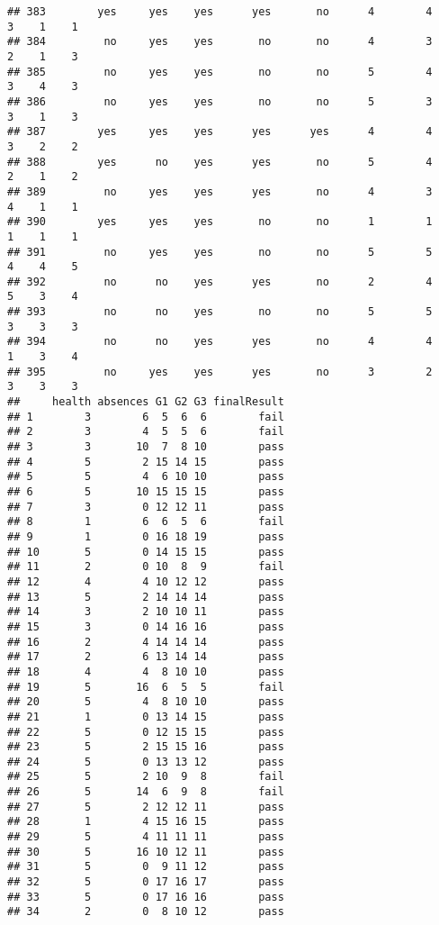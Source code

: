 \documentclass[
]{article}
\begin{document}
\begin{verbatim}
## 383        yes     yes    yes      yes       no      4        4     3    1    1
## 384         no     yes    yes       no       no      4        3     2    1    3
## 385         no     yes    yes       no       no      5        4     3    4    3
## 386         no     yes    yes       no       no      5        3     3    1    3
## 387        yes     yes    yes      yes      yes      4        4     3    2    2
## 388        yes      no    yes      yes       no      5        4     2    1    2
## 389         no     yes    yes      yes       no      4        3     4    1    1
## 390        yes     yes    yes       no       no      1        1     1    1    1
## 391         no     yes    yes       no       no      5        5     4    4    5
## 392         no      no    yes      yes       no      2        4     5    3    4
## 393         no      no    yes       no       no      5        5     3    3    3
## 394         no      no    yes      yes       no      4        4     1    3    4
## 395         no     yes    yes      yes       no      3        2     3    3    3
##     health absences G1 G2 G3 finalResult
## 1        3        6  5  6  6        fail
## 2        3        4  5  5  6        fail
## 3        3       10  7  8 10        pass
## 4        5        2 15 14 15        pass
## 5        5        4  6 10 10        pass
## 6        5       10 15 15 15        pass
## 7        3        0 12 12 11        pass
## 8        1        6  6  5  6        fail
## 9        1        0 16 18 19        pass
## 10       5        0 14 15 15        pass
## 11       2        0 10  8  9        fail
## 12       4        4 10 12 12        pass
## 13       5        2 14 14 14        pass
## 14       3        2 10 10 11        pass
## 15       3        0 14 16 16        pass
## 16       2        4 14 14 14        pass
## 17       2        6 13 14 14        pass
## 18       4        4  8 10 10        pass
## 19       5       16  6  5  5        fail
## 20       5        4  8 10 10        pass
## 21       1        0 13 14 15        pass
## 22       5        0 12 15 15        pass
## 23       5        2 15 15 16        pass
## 24       5        0 13 13 12        pass
## 25       5        2 10  9  8        fail
## 26       5       14  6  9  8        fail
## 27       5        2 12 12 11        pass
## 28       1        4 15 16 15        pass
## 29       5        4 11 11 11        pass
## 30       5       16 10 12 11        pass
## 31       5        0  9 11 12        pass
## 32       5        0 17 16 17        pass
## 33       5        0 17 16 16        pass
## 34       2        0  8 10 12        pass

\end{verbatim}
\end{document}
